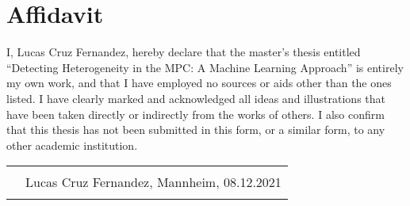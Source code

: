 \section{Affidavit}
I, Lucas Cruz Fernandez, hereby declare that the master’s thesis entitled “Detecting Heterogeneity in the MPC: A Machine Learning Approach” is entirely my own work, and that I have employed no sources or aids other than the ones listed. I have clearly marked and acknowledged all ideas and illustrations that have been taken directly or indirectly from the works of others. I also confirm that this thesis has not been submitted in this form, or a similar form, to any other academic institution. \\[1.5cm]
\begin{tabular}{@{}p{.5in}p{4in}@{}}
    & \hrulefill \\
    & Lucas Cruz Fernandez, Mannheim, 08.12.2021 \\
    & \\
    \end{tabular}